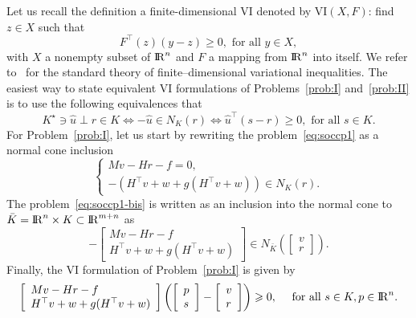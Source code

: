 Let us recall the definition a finite-dimensional VI denoted by $\mathrm{VI}(X,F)$: find $z\in X$ such that 
\begin{equation}
  \label{eq:vi}
  F^\top(z)(y-z) \geq 0, \text{ for all } y \in X,
\end{equation}
with $X$ a nonempty subset of $\mathrm{I\!R}^n$ and $F$ a mapping from $\mathrm{I\!R}^n$ into itself. We refer to~\cite{Harker.Pang1990,Facchinei.Pang2003} for the standard  theory of finite--dimensional variational inequalities. The easiest way to state equivalent VI formulations of Problems~\ref{prob:I} and~\ref{prob:II} is to use the following equivalences that
\begin{equation}
  \label{eq:SOCCP-1}
  K^\star \ni {\hat u} \perp r \in K \Longleftrightarrow
  - {\hat u} \in N_K(r)  \Longleftrightarrow \hat u^\top (s -r) \geq 0, \text{ for all } s \in K.
\end{equation}
For Problem~\ref{prob:I}, let us start by rewriting the problem~\eqref{eq:soccp1} as a normal cone inclusion
\begin{equation}
  \label{eq:soccp1-bis}
  \left\{\begin{array}{l}
    M v-H r-f=0, \\[2mm]
   -(H^\top v + w + g(H^\top v + w)) \in N_K(r).
 \end{array}\right.
\end{equation}
The problem~\eqref{eq:soccp1-bis} is written as an inclusion into the normal cone to $\bar K = \mathrm{I\!R}^n  \times K\subset \mathrm{I\!R}^{m+n}$ as
\begin{equation}
  \label{eq:soccp1-ter}
  - \left[\begin{array}{l}
    M v-H r-f \\
    H^\top v+w  + g(H^\top v +w)
 \end{array}\right]    \in N_{\bar K}\left(
\left[\begin{array}{l}
  v \\r
\end{array}\right]
\right).
\end{equation}
Finally, the VI formulation of Problem~\ref{prob:I} is given by
\begin{equation}
  \label{eq:vi-I-bis}
  \left[\begin{array}{l}
    M v-H r-f \\
    H^\top v+w  + g(H^\top v +w)
  \end{array}\right] \left(
  \left[\begin{array}{l}
      p  \\ s
    \end{array}\right] - \left[\begin{array}{l}
      v  \\ r
    \end{array}\right]
\right) \geq 0,\quad \text{ for all } s \in K,  p \in \RR^n.
\end{equation}

